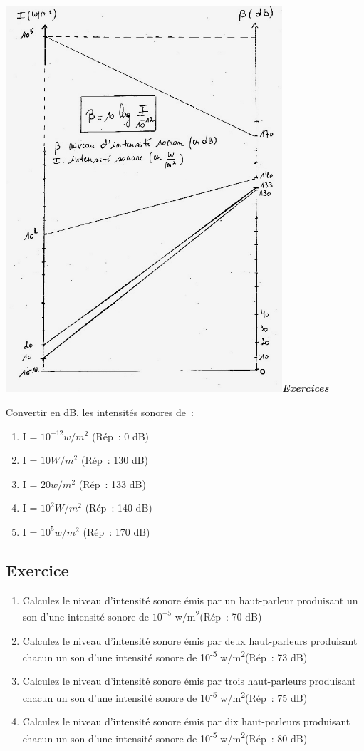 \includegraphics[width=10.269cm,height=14.349cm]{Pictures/10000001000002480000033056ED2EA613E32604.png}\emph{\textbf{Exercices}}

Convertir en dB, les intensités sonores de~:

\begin{enumerate}
	\item I = $10^{-12} \si{w/m^2}$ (Rép~: 0 dB)
	\item I = $10 \si{ W/m^2 }$ (Rép~: 130 dB)
        \item I = $20 \si{w/m^2}$ (Rép~: 133 dB)
	\item I = $10^{2} \si{W/m^2}$ (Rép~: 140 dB)
	\item I = $10^5 \si{w/m^2}$ (Rép~: 170 dB)
\end{enumerate}

\subsection{Exercice}\label{exercice-son}

\begin{enumerate}
\item Calculez le niveau d'intensité sonore émis par un haut-parleur
produisant un son d'une intensité sonore de $10^{-5}$ \si{w/m^2}(Rép~: 70 dB)
\item Calculez le niveau d'intensité sonore émis par deux haut-parleurs
produisant chacun un son d'une intensité sonore de
10\textsuperscript{-5} \si{w/m^2}(Rép~: 73 dB)
\item Calculez le niveau d'intensité sonore émis par trois haut-parleurs
produisant chacun un son d'une intensité sonore de
10\textsuperscript{-5} \si{w/m^2}(Rép~: 75 dB)
\item Calculez le niveau d'intensité sonore émis par dix haut-parleurs
produisant chacun un son d'une intensité sonore de
10\textsuperscript{-5} \si{w/m^2}(Rép~: 80 dB)
\end{enumerate}

